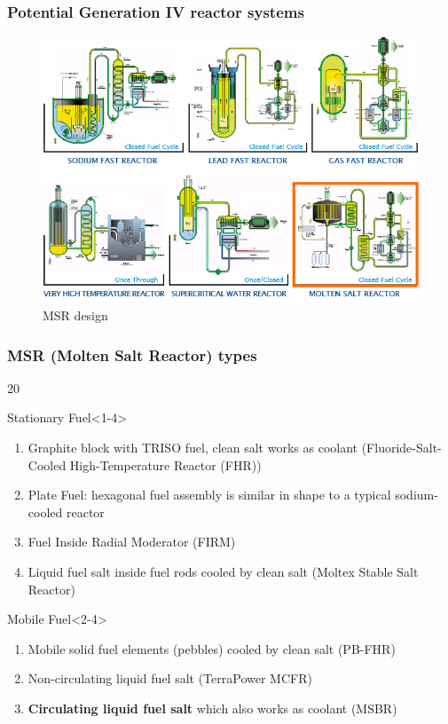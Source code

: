 \begin{frame}
\frametitle{Potential Generation IV reactor systems \cite{abram_generation-iv_2008}}
\begin{figure}[t]
	\vspace*{-0.1in}
	\includegraphics[height=0.7\textwidth]{./images/6_types.png}
	\caption{\gls{MSR} design}
\end{figure}            
\end{frame}


\begin{frame}
\frametitle{MSR (Molten Salt Reactor) types}
\begin{overlayarea}{\linewidth}{20\baselineskip}
\begin{block}{Stationary Fuel}<1-4>
	\begin{enumerate}
		\item Graphite block with TRISO fuel, clean salt works as 
		coolant (Fluoride-Salt-Cooled High-Temperature 
		Reactor (FHR))
		\item Plate Fuel: hexagonal fuel assembly is similar in shape to a typical sodium-cooled reactor
		\item Fuel Inside Radial Moderator (FIRM)
		\item Liquid fuel salt inside fuel rods cooled by clean salt 
		(Moltex Stable Salt Reactor)
	\end{enumerate}
\end{block}

\begin{block}{Mobile Fuel}<2-4>
	\begin{enumerate}
		\item<2-4> Mobile solid fuel elements (pebbles) cooled by 
		clean salt (PB-FHR)
		\item<3-4> Non-circulating liquid fuel salt (TerraPower \gls{MCFR}) 
		\item<4> \textbf{Circulating liquid fuel salt} which also works 
		as coolant (\gls{MSBR})
	\end{enumerate}
\end{block}
\end{overlayarea}
\end{frame}


